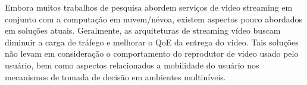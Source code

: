 Embora muitos trabalhos de pesquisa abordem serviços de video streaming em conjunto com a computação em nuvem/névoa, existem aspectos pouco abordados em soluções atuais. Geralmente, as arquiteturas de streaming vídeo buscam diminuir a carga de tráfego e melhorar o QoE da entrega do video.
Tais soluções não levam em consideração o comportamento do reprodutor de video usado pelo usuário, bem como aspectos relacionados a mobilidade do usuário nos mecanismos de tomada de decisão em ambientes multiníveis. 





